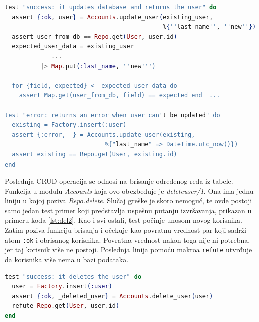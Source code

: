 \documentclass[12pt,oneside]{memoir}
\begin{document}
\begin{minipage}{\linewidth}
\begin{lstlisting}[language=elixir, basicstyle=\small, caption={Testiranje funkcije \emph{update{\textunderscore}user/2}},captionpos=b, label={lst:upd}]
test "success: it updates database and returns the user" do
  assert {:ok, user} = Accounts.update_user(existing_user,
  						                    %{''last_name'', ''new''})
  assert user_from_db == Repo.get(User, user.id)
  expected_user_data = existing_user
        	 ...
          |> Map.put(:last_name, ''new''')
          
  for {field, expected} <- expected_user_data do
    assert Map.get(user_from_db, field) == expected end  ...

test "error: returns an error when user can't be updated" do
  existing = Factory.insert(:user)
  assert {:error, _} = Accounts.update_user(existing, 
  							%{"last_name" => DateTime.utc_now()})
  assert existing == Repo.get(User, existing.id)
end
 \end{lstlisting}
\end{minipage}

\par Poslednja CRUD operacija se odnosi na brisanje određenog reda iz tabele. Funkcija u modulu \emph{Accounts} koja ovo obezbeđuje je \emph{delete{\textunderscore}user/1}. Ona ima jednu liniju u kojoj poziva \emph{Repo.delete}. Slučaj greške je skoro nemoguć, te ovde postoji samo jedan test primer koji predstavlja uspešnu putanju izvršavanja, prikazan u primeru koda \ref{lst:del2}. Kao i svi ostali, test počinje unosom novog korisnika. Zatim poziva funkciju brisanja i očekuje kao povratnu vrednost par koji sadrži atom \texttt{:ok} i obrisanog korisnika. Povratna vrednost nakon toga nije ni potrebna, jer taj korisnik više ne postoji. Poslednja linija pomoću makroa \texttt{refute} utvrđuje da korisnika više nema u bazi podataka. \\

\begin{minipage}{\linewidth}
\begin{lstlisting}[language=elixir, basicstyle=\small, caption={Testiranje funkcije \emph{delete{\textunderscore}user/1}},captionpos=b, label={lst:del2}]
test "success: it deletes the user" do
  user = Factory.insert(:user)
  assert {:ok, _deleted_user} = Accounts.delete_user(user)
  refute Repo.get(User, user.id)
end
\end{lstlisting}
\end{minipage}
\end{document}
